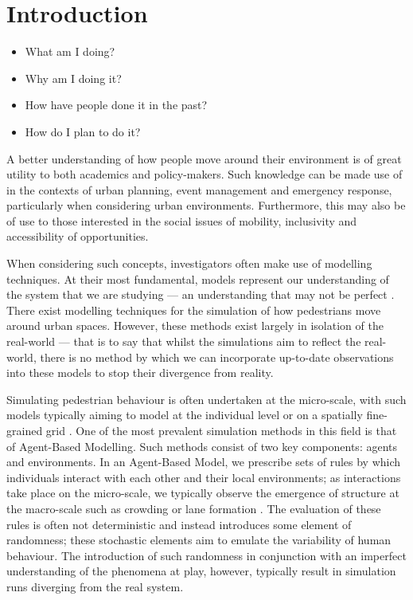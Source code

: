 \section{Introduction}\label{sec:intro}

\begin{itemize}
    \item What am I doing?
    \item Why am I doing it?
    \item How have people done it in the past?
    \item How do I plan to do it?
\end{itemize}

A better understanding of how people move around their environment is of great
utility to both academics and policy-makers.
Such knowledge can be made use of in the contexts of urban planning, event
management and emergency response, particularly when considering urban
environments.
Furthermore, this may also be of use to those interested in the social issues of
mobility, inclusivity and accessibility of opportunities.

When considering such concepts, investigators often make use of modelling
techniques.
At their most fundamental, models represent our understanding of
the system that we are studying --- an understanding that may not be perfect
\citep{stanislaw1986tests}.
There exist modelling techniques for the simulation of how pedestrians move
around urban spaces.
However, these methods exist largely in isolation of the real-world --- that is
to say that whilst the simulations aim to reflect the real-world, there is no
method by which we can incorporate up-to-date observations into these models to
stop their divergence from reality.

Simulating pedestrian behaviour is often undertaken at the micro-scale, with
such models typically aiming to model at the individual level or on a spatially
fine-grained grid \citep{burstedde2001simulation}.
One of the most prevalent simulation methods in this field is that of
Agent-Based Modelling.
Such methods consist of two key components: agents and environments.
In an Agent-Based Model, we prescribe sets of rules by which individuals interact with each
other and their local environments; as interactions take place on the
micro-scale, we typically observe the emergence of structure at the macro-scale
such as crowding \citep{batty2003discrete} or lane formation \citep{liu2014agent}.
The evaluation of these rules is often not deterministic and instead
introduces some element of randomness; these stochastic elements aim to emulate
the variability of human behaviour.
The introduction of such randomness in conjunction with an imperfect
understanding of the phenomena at play, however, typically result in simulation
runs diverging from the real system.


